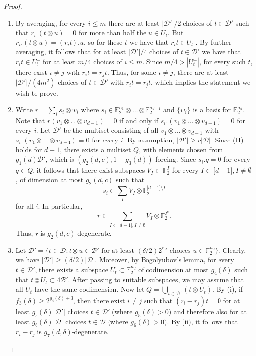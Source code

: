 \documentclass{toc}
\newcommand\F{\mathbb{F}}
\renewcommand\d{\delta}
\newcommand \cB{\mathcal B}
\newcommand \cD{\mathcal D}
\newcommand \s{\subset}
\begin{document}
\begin{proof}
	\begin{enumerate}[label=(\roman*)]
		\item By averaging, for every $i\leq m$ there are at least $|\cD'|/2$ choices of $t\in\cD'$ such that $r_i.(t\otimes u)=0$ for more than half the $u\in U_t$. But $r_i.(t\otimes u)=(r_it).u$, so for these $t$ we have that $r_it\in U_t^\perp$. By further averaging, it follows that for at least $|\cD'|/4$ choices of $t\in \cD'$ we have that $r_it\in U_t^{\perp}$ for at least $m/4$ choices of $i\leq m$. Since $m/4>|U_t^{\perp}|$, for every such $t$, there exist $i\neq j$ with $r_it=r_jt$. Thus, for some $i\neq j$, there are at least ${|\cD'|}/{(4m^2)}$ choices of $t\in \cD'$ with $r_it=r_jt$, which implies the statement we wish to prove.
		\item Write $r=\sum_{i} s_i\otimes w_i$ where $s_i\in \F_2^{n_1}\otimes \dots \otimes \F_2^{n_{d-1}}$ and $\{w_i\}$ is a basis for $\F_2^{n_d}$. Note that $r(v_1\otimes \dots \otimes v_{d-1})=0$ if and only if $s_i.(v_1\otimes \dots \otimes v_{d-1})=0$ for every $i$. Let $\cD'$ be the multiset consisting of all $v_1\otimes \dots \otimes v_{d-1}$ with $s_i.(v_1 \otimes \dots \otimes v_{d-1})=0$ for every $i$. By assumption, $|\cD'|\geq c|\cD|$. Since (H) holds for $d-1$, there exists a multiset $Q$, with elements chosen from $g_1(d)\cD'$, which is $(g_2(d,c),1-g_3(d))$-forcing. Since $s_i.q=0$ for every $q\in Q$, it follows that there exist subspaces $V_I\s \F_2^{I}$ for every $I\s \lbrack d-1\rbrack,I\neq \emptyset$, of dimension at most $g_2(d,c)$ such that
                  \[
                    s_i\in \sum_{I}V_I\otimes \F_2^{\lbrack d-1\rbrack \setminus I}
                  \]
                  for all $i$. In particular,
                  \[
                    r\in \sum_{I\s \lbrack d-1 \rbrack, I\neq
                      \emptyset} V_I\otimes \F_2^{I^c}.
                  \]
                  Thus, $r$ is $g_2(d,c)$-degenerate.
		\item Let $\cD'=\{t\in \cD: t\otimes u\in \cB' \text{ for at least } ({\d}/{2})2^{n_d} \text{ choices } u\in \F_2^{n_d}\}$. Clearly, we have $|\cD'|\geq ({\d}/{2})|\cD|$. Moreover, by Bogolyubov's lemma, for every $t\in \cD'$, there exists a subspace $U_t\s \F_2^{n_d}$ of codimension at most $g_4(\d)$ such that $t\otimes U_t\s 4\cB'$. After passing to suitable subspaces, we may assume that all $U_t$ have the same codimension. Now let $Q=\bigcup_{t\in \cD'}(t\otimes U_t)$. By (i), if $f_3(\d)\geq 2^{g_4(\d)+3}$, then there exist $i\neq j$ such that $(r_i-r_j)t=0$ for at least $g_5(\d)|\cD'|$ choices $t\in \cD'$ (where $g_5(\d)>0$) and therefore also for at least $g_6(\d)|\cD|$ choices $t\in \cD$ (where $g_6(\d)>0$). By (ii), it follows that $r_i-r_j$ is $g_7(d,\d)$-degenerate.

\end{enumerate}
\end{proof}
\end{document}
